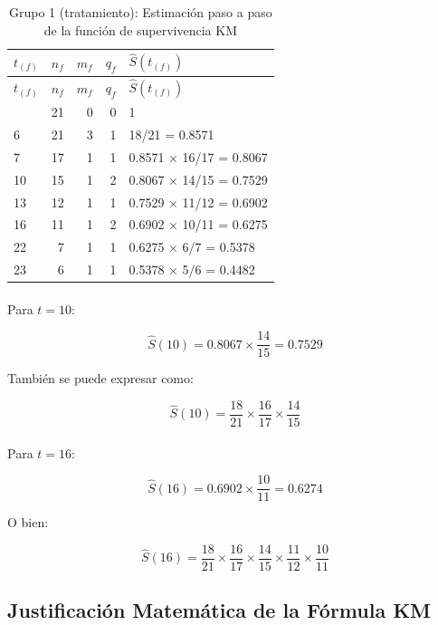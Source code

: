 \documentclass[
]{article}
\makeatletter
\let\oldparagraph\paragraph
\renewcommand{\paragraph}{
    \@ifstar
      \xxxParagraphStar
      \xxxParagraphNoStar
  }
\newcommand{\xxxParagraphStar}[1]{\oldparagraph*{#1}\mbox{}}
\newcommand{\xxxParagraphNoStar}[1]{\oldparagraph{#1}\mbox{}}
\makeatother
\begin{document}
\begin{longtable}[]{@{}lrrrl@{}}
\caption{Grupo 1 (tratamiento): Estimación paso a paso de la función de
supervivencia KM}\tabularnewline
\toprule\noalign{}
\(t_{(f)}\) & \(n_f\) & \(m_f\) & \(q_f\) & \(\hat{S}(t_{(f)})\) \\
\midrule\noalign{}
\endfirsthead
\toprule\noalign{}
\(t_{(f)}\) & \(n_f\) & \(m_f\) & \(q_f\) & \(\hat{S}(t_{(f)})\) \\
\midrule\noalign{}
\endhead
\bottomrule\noalign{}
\endlastfoot
0 & 21 & 0 & 0 & 1 \\
6 & 21 & 3 & 1 & 18/21 = 0.8571 \\
7 & 17 & 1 & 1 & 0.8571 × 16/17 = 0.8067 \\
10 & 15 & 1 & 2 & 0.8067 × 14/15 = 0.7529 \\
13 & 12 & 1 & 1 & 0.7529 × 11/12 = 0.6902 \\
16 & 11 & 1 & 2 & 0.6902 × 10/11 = 0.6275 \\
22 & 7 & 1 & 1 & 0.6275 × 6/7 = 0.5378 \\
23 & 6 & 1 & 1 & 0.5378 × 5/6 = 0.4482 \\
\end{longtable}

\paragraph{\texorpdfstring{Para
\(t = 10\):}{Para t = 10:}}\label{para-t-10}

\[
\hat{S}(10) = 0.8067 \times \frac{14}{15} = 0.7529
\]

También se puede expresar como:

\[
\hat{S}(10) = \frac{18}{21} \times \frac{16}{17} \times \frac{14}{15}
\]

\paragraph{\texorpdfstring{Para
\(t = 16\):}{Para t = 16:}}\label{para-t-16}

\[
\hat{S}(16) = 0.6902 \times \frac{10}{11} = 0.6274
\]

O bien:

\[
\hat{S}(16) = \frac{18}{21} \times \frac{16}{17} \times \frac{14}{15} \times \frac{11}{12} \times \frac{10}{11}
\]

\subsection{Justificación Matemática de la Fórmula
KM}\label{justificaciuxf3n-matemuxe1tica-de-la-fuxf3rmula-km}
\end{document}
